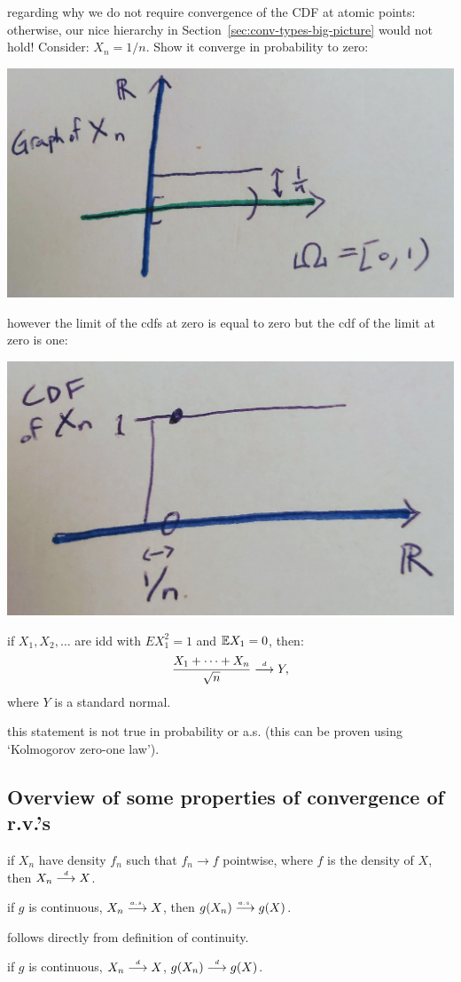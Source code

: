 \documentclass{article}
\begin{document}
 regarding why we do not require convergence of the CDF at atomic points: otherwise, our nice hierarchy in Section~\ref{sec:conv-types-big-picture} would not hold! Consider: $X_n = 1/n$. Show it converge in probability to zero:
\begin{center}
	\includegraphics[width=0.5\linewidth]{figures/conv-dist-counter} 
\end{center}
however the limit of the cdfs at zero is equal to zero but the cdf of the limit at zero is one:
\begin{center}
	\includegraphics[width=0.5\linewidth]{figures/conv-dist-counter-2} 
\end{center}

 if $X_1, X_2, \dots$ are idd with $E X_1^2 = 1$ and ${\mathbb E} X_1 = 0$, then:
\[ \frac{X_1 + \dots + X_n}{\sqrt{n}} \stackrel{\scriptscriptstyle d}{\longrightarrow} Y, \]
where $Y$ is a standard normal. 

 this statement is not true in probability or a.s. (this can be proven using `Kolmogorov zero-one law').


\subsection{Overview of some properties of convergence of r.v.'s}

 if $X_n$ have density $f_n$ such that $f_n \to f$ pointwise, where $f$ is the density of $X$, then $X_n \stackrel{\scriptscriptstyle d}{\longrightarrow} X$.


  if $g$ is continuous, $X_n \stackrel{\scriptscriptstyle a.s.}{\longrightarrow} X$, then $g(X_n) \stackrel{\scriptscriptstyle a.s.}{\longrightarrow} g(X)$. 

 follows directly from definition of continuity. 

 if $g$ is continuous, $X_n \stackrel{\scriptscriptstyle d}{\longrightarrow} X$,  $g(X_n) \stackrel{\scriptscriptstyle d}{\longrightarrow} g(X)$. 
\end{document}
